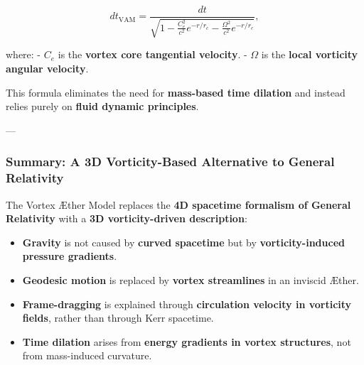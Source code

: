 \begin{equation*}
    dt_\text{VAM} = \frac{dt}{\sqrt{1 - \frac{C_e^2}{c^2} e^{-r/r_c} - \frac{\Omega^2}{c^2} e^{-r/r_c}}},
\end{equation*}

where:
- \( C_e \) is the \textbf{vortex core tangential velocity}.
- \( \Omega \) is the \textbf{local vorticity angular velocity}.

This formula eliminates the need for \textbf{mass-based time dilation} and instead relies purely on \textbf{fluid dynamic principles}.

---

\subsubsection*{Summary: A 3D Vorticity-Based Alternative to General Relativity}

The Vortex Æther Model replaces the \textbf{4D spacetime formalism of General Relativity} with a \textbf{3D vorticity-driven description}:

\begin{itemize}
    \item \textbf{Gravity} is not caused by \textbf{curved spacetime} but by \textbf{vorticity-induced pressure gradients}.
    \item \textbf{Geodesic motion} is replaced by \textbf{vortex streamlines} in an inviscid Æther.
    \item \textbf{Frame-dragging} is explained through \textbf{circulation velocity in vorticity fields}, rather than through Kerr spacetime.
    \item \textbf{Time dilation} arises from \textbf{energy gradients in vortex structures}, not from mass-induced curvature.
\end{itemize}
